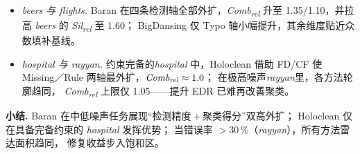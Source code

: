 \documentclass[10pt]{article} %
\numberwithin{equation}{section}
\begin{document}
\begin{itemize}[leftmargin=1.6em,topsep=2pt,itemsep=2pt]
  \item \emph{beers 与 flights.}  
        Baran 在四条检测轴全部外扩，\textit{Comb\textsubscript{rel}} 升至  
        1.35/1.10，并拉高 \emph{beers} 的 \textit{Sil\textsubscript{rel}} 至 1.60；  
        BigDansing 仅 Typo 轴小幅提升，其余维度贴近众数填补基线。  

  \item \emph{hospital 与 rayyan.}  
        约束完备的\emph{hospital} 中，Holoclean 借助 FD/CF 使  
        Missing／Rule 两轴最外扩，\(\textit{Comb\textsubscript{rel}}\approx1.0\)；  
        在极高噪声\emph{rayyan}里，各方法轮廓趋同，
        \textit{Comb\textsubscript{rel}} 上限仅 1.05——提升 EDR 已难再改善聚类。  
\end{itemize}

\noindent\textbf{小结.}  
Baran 在中低噪声任务展现“检测精度 + 聚类得分”双高外扩；  
Holoclean 仅在具备完备约束的 \emph{hospital} 发挥优势；  
当错误率 \(>\!30\,\%\)（\emph{rayyan}），所有方法雷达面积趋同，%
修复收益步入饱和区。

\end{document}
